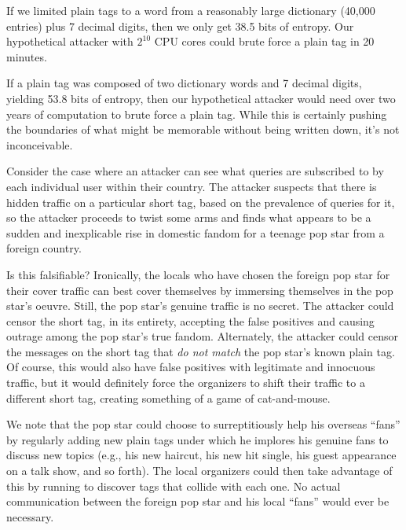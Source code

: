 If we limited plain tags to a word from a reasonably large dictionary
(40,000 entries) plus 7 decimal digits, then we only get 38.5 bits of
entropy.  Our hypothetical attacker with $2^{10}$ CPU cores could brute
force a plain tag in 20 minutes.

If a plain tag was composed of two dictionary words and 7 decimal
digits, yielding 53.8 bits of entropy, then our hypothetical attacker
would need over two years of computation to brute force a plain
tag. While this is certainly pushing the boundaries of what might be
memorable without being written down, it's not inconceivable.

%
Consider the case where an attacker can see what queries are
subscribed to by each individual user within their country. The
attacker suspects that there is hidden traffic on a particular short
tag, based on the prevalence of queries for it, so the attacker
proceeds to twist some arms and finds what appears to be a
sudden and inexplicable rise in domestic fandom for a teenage pop star
from a foreign country.

Is this falsifiable? Ironically, the locals who have chosen the
foreign pop star for their cover traffic can best cover themselves by
immersing themselves in the pop star's oeuvre. Still, the pop star's
genuine traffic is no secret. The attacker could censor the short tag,
in its entirety, accepting the false positives and causing outrage
among the pop star's true fandom. Alternately, the
attacker could censor the \hoot messages on the short tag that {\em do
not match} the pop star's known plain tag. Of course, this would also
have false positives with legitimate and innocuous traffic, but it
would definitely force the organizers to shift their traffic to a
different short tag, creating something of a game of cat-and-mouse.

We note that the pop star could choose to surreptitiously help his
overseas ``fans'' by regularly adding new plain tags under which he
implores his genuine fans to discuss new topics (e.g., his new
haircut, his new hit single, his guest appearance on a talk show, and
so forth). The local organizers could then take advantage of this by
running  to discover tags that collide with each
one. No actual communication between the foreign pop star and his
local ``fans'' would ever be necessary.


